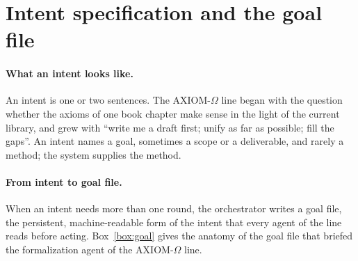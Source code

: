 \documentclass[11pt]{article}
\begin{document}
\section{Intent specification and the goal file}
\label{sec:intents}
\paragraph{What an intent looks like.} An intent is one or two sentences. The
AXIOM-$\Omega$ line began with the question whether the axioms of one book
chapter make sense in the light of the current library, and grew with
``write me a draft first; unify as far as possible; fill the gaps''. An intent
names a goal, sometimes a scope or a deliverable, and rarely a method; the
system supplies the method.

\paragraph{From intent to goal file.} When an intent needs more than one round,
the orchestrator writes a goal file, the persistent, machine-readable form of the intent
that every agent of the line reads before acting. Box~\ref{box:goal} gives
the anatomy of the goal file that briefed the formalization agent of the
AXIOM-$\Omega$ line.
\end{document}
